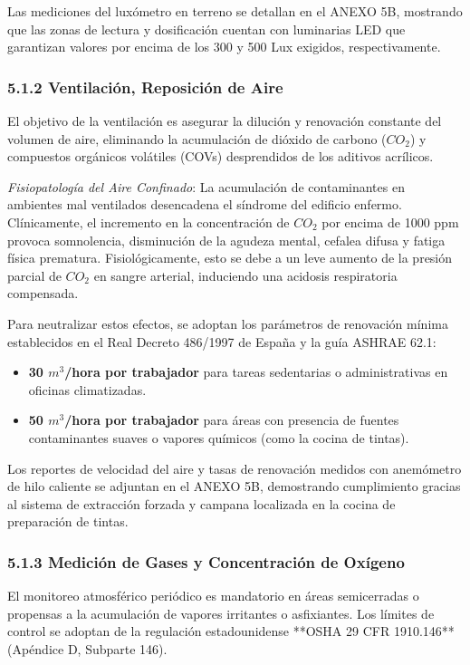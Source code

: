 \documentclass[11pt, letterpaper]{article}
\begin{document}
Las mediciones del luxómetro en terreno se detallan en el ANEXO 5B, mostrando que las zonas de lectura y dosificación cuentan con luminarias LED que garantizan valores por encima de los 300 y 500 Lux exigidos, respectivamente.

\subsubsection{5.1.2 Ventilación, Reposición de Aire}
El objetivo de la ventilación es asegurar la dilución y renovación constante del volumen de aire, eliminando la acumulación de dióxido de carbono ($CO_2$) y compuestos orgánicos volátiles (COVs) desprendidos de los aditivos acrílicos.

\textit{Fisiopatología del Aire Confinado}: La acumulación de contaminantes en ambientes mal ventilados desencadena el síndrome del edificio enfermo. Clínicamente, el incremento en la concentración de $CO_2$ por encima de 1000 ppm provoca somnolencia, disminución de la agudeza mental, cefalea difusa y fatiga física prematura. Fisiológicamente, esto se debe a un leve aumento de la presión parcial de $CO_2$ en sangre arterial, induciendo una acidosis respiratoria compensada. 

Para neutralizar estos efectos, se adoptan los parámetros de renovación mínima establecidos en el Real Decreto 486/1997 de España y la guía ASHRAE 62.1:
\begin{itemize}
    \item \textbf{30 $m^3$/hora por trabajador} para tareas sedentarias o administrativas en oficinas climatizadas.
    \item \textbf{50 $m^3$/hora por trabajador} para áreas con presencia de fuentes contaminantes suaves o vapores químicos (como la cocina de tintas).
\end{itemize}

Los reportes de velocidad del aire y tasas de renovación medidos con anemómetro de hilo caliente se adjuntan en el ANEXO 5B, demostrando cumplimiento gracias al sistema de extracción forzada y campana localizada en la cocina de preparación de tintas.

\subsubsection{5.1.3 Medición de Gases y Concentración de Oxígeno}
El monitoreo atmosférico periódico es mandatorio en áreas semicerradas o propensas a la acumulación de vapores irritantes o asfixiantes. Los límites de control se adoptan de la regulación estadounidense **OSHA 29 CFR 1910.146** (Apéndice D, Subparte 146).
\end{document}
